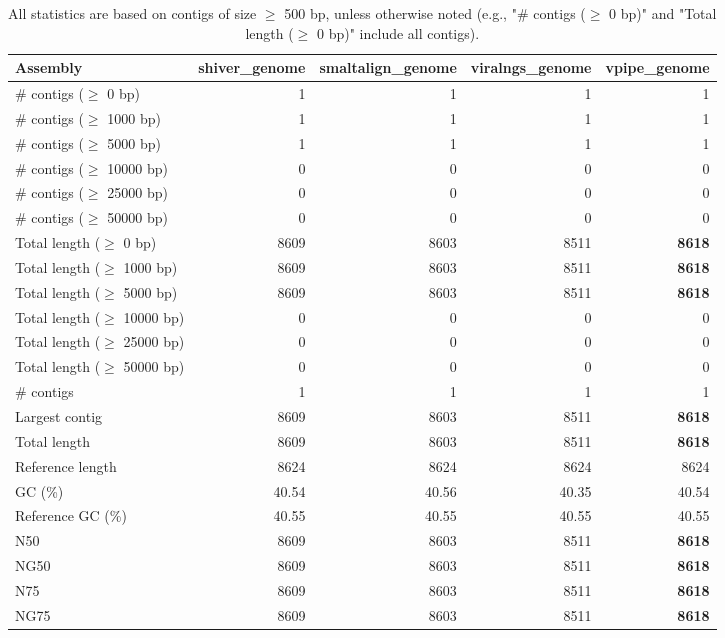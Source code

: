 \documentclass[12pt,a4paper]{article}
\begin{document}
\begin{table}[ht]
\begin{center}
\caption{All statistics are based on contigs of size $\geq$ 500 bp, unless otherwise noted (e.g., "\# contigs ($\geq$ 0 bp)" and "Total length ($\geq$ 0 bp)" include all contigs).}
\begin{tabular}{|l*{4}{|r}|}
\hline
Assembly & shiver\_genome & smaltalign\_genome & viralngs\_genome & vpipe\_genome \\ \hline
\# contigs ($\geq$ 0 bp) & 1 & 1 & 1 & 1 \\ \hline
\# contigs ($\geq$ 1000 bp) & 1 & 1 & 1 & 1 \\ \hline
\# contigs ($\geq$ 5000 bp) & 1 & 1 & 1 & 1 \\ \hline
\# contigs ($\geq$ 10000 bp) & 0 & 0 & 0 & 0 \\ \hline
\# contigs ($\geq$ 25000 bp) & 0 & 0 & 0 & 0 \\ \hline
\# contigs ($\geq$ 50000 bp) & 0 & 0 & 0 & 0 \\ \hline
Total length ($\geq$ 0 bp) & 8609 & 8603 & 8511 & {\bf 8618} \\ \hline
Total length ($\geq$ 1000 bp) & 8609 & 8603 & 8511 & {\bf 8618} \\ \hline
Total length ($\geq$ 5000 bp) & 8609 & 8603 & 8511 & {\bf 8618} \\ \hline
Total length ($\geq$ 10000 bp) & 0 & 0 & 0 & 0 \\ \hline
Total length ($\geq$ 25000 bp) & 0 & 0 & 0 & 0 \\ \hline
Total length ($\geq$ 50000 bp) & 0 & 0 & 0 & 0 \\ \hline
\# contigs & 1 & 1 & 1 & 1 \\ \hline
Largest contig & 8609 & 8603 & 8511 & {\bf 8618} \\ \hline
Total length & 8609 & 8603 & 8511 & {\bf 8618} \\ \hline
Reference length & 8624 & 8624 & 8624 & 8624 \\ \hline
GC (\%) & 40.54 & 40.56 & 40.35 & 40.54 \\ \hline
Reference GC (\%) & 40.55 & 40.55 & 40.55 & 40.55 \\ \hline
N50 & 8609 & 8603 & 8511 & {\bf 8618} \\ \hline
NG50 & 8609 & 8603 & 8511 & {\bf 8618} \\ \hline
N75 & 8609 & 8603 & 8511 & {\bf 8618} \\ \hline
NG75 & 8609 & 8603 & 8511 & {\bf 8618} \\ \hline

\end{tabular}
\end{center}
\end{table}
\end{document}
